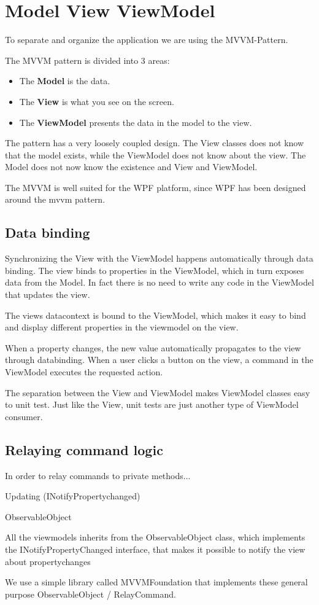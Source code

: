 \section{Model View ViewModel}\label{MVVMSection}
To separate and organize the application we are using the MVVM-Pattern.

The MVVM pattern is divided into 3 areas:

\begin{itemize}
	\item The \textbf{Model} is the data.
	\item The \textbf{View} is what you see on the screen.
	\item The \textbf{ViewModel} presents the data in the model to the view.
\end{itemize}

The pattern has a very loosely coupled design.
The View classes does not know that the model exists, while the ViewModel does not know about the view. The Model does not now know the existence and View and ViewModel.

The MVVM is well suited for the WPF platform, since WPF has been designed around the mvvm pattern.

\subsection{Data binding}
Synchronizing the View with the ViewModel happens automatically through data binding.
The view binds to properties in the ViewModel, which in turn exposes data from the Model. In fact there is no need to write any code in the ViewModel that updates the view.

The views datacontext is bound to the ViewModel, which makes it easy to bind and display different properties in the viewmodel on the view.

When a property changes, the new value automatically propagates to the view through databinding.
When a user clicks a button on the view, a command in the ViewModel executes the requested action.

The separation between the View and ViewModel makes ViewModel classes easy to unit test. Just like the View, unit tests are just another type of ViewModel consumer.

\subsection{Relaying command logic}
In order to relay commands to private methods...

Updating (INotifyPropertychanged)

ObservableObject 

All the viewmodels inherits from the ObservableObject class, which implements the INotifyPropertyChanged interface, that makes it possible to notify the view about propertychanges

We use a simple library called MVVMFoundation that implements these general purpose ObservableObject / RelayCommand.